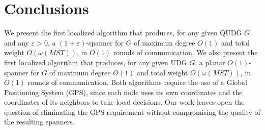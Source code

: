 \documentclass{llncs}
\newcommand{\e}{\varepsilon}
\newcommand{\w}{\omega}
\begin{document}
\section{Conclusions}
We present the first localized algorithm that produces, for any given QUDG $G$ and any $\e > 0$, a
$(1+\e)$-spanner for $G$ of maximum degree $O(1)$ and total weight $O(\w(MST))$, in $O(1)$ rounds of communication.
We also present the first localized algorithm that produces, for any given UDG $G$, a planar
$O(1)$-spanner for $G$ of maximum degree $O(1)$ and total weight $O(\w(MST))$, in $O(1)$ rounds of communication.
Both algorithms require the use of a Global Positioning System (GPS), since each node uses its own
coordinates and the coordinates of its neighbors to take local decisions. Our work leaves open the
question of eliminating the GPS requirement without compromising the quality of the
resulting spanners.
\end{document}

